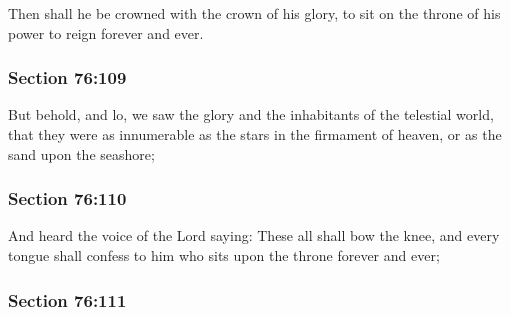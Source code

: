 		Then shall he be crowned with the crown of his glory, to sit on the throne of his power to reign forever and ever.


	\subsubsection{Section 76:109} %
		\label{DC76-109}

		But behold, and lo, we saw the glory and the inhabitants of the telestial world, that they were as innumerable as the stars in the firmament of heaven, or as the sand upon the seashore;


	\subsubsection{Section 76:110} %
		\label{DC76-110}

		And heard the voice of the Lord saying: These all shall bow the knee, and every tongue shall confess to him who sits upon the throne forever and ever;


	\subsubsection{Section 76:111} %
		\label{DC76-111}

